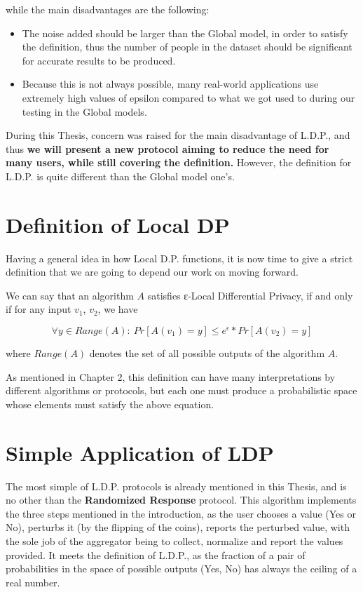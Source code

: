 while the main disadvantages are the following:

\begin{itemize}
    \item The noise added should be larger than the Global model, in order to satisfy the definition, thus the number of people in the dataset should be significant for accurate results to be produced.
    \item Because this is not always possible, many real-world applications use extremely high values of epsilon compared to what we got used to during our testing in the Global models.
\end{itemize}

During this Thesis, concern was raised for the main disadvantage of L.D.P., and thus\textbf{ we will present a new protocol aiming to reduce the need for many users, while still covering the definition.} However, the definition for L.D.P. is quite different than the Global model one's.

\section{Definition of Local DP}

Having a general idea in how Local D.P. functions, it is now time to give a strict definition that we are going to depend our work on moving forward.

We can say that an algorithm $A$ satisfies ε-Local Differential Privacy, if and only if for any input $v_1$, $v_2$, we have

$$ \forall y \in Range(A):\ Pr[A(v_1) = y] \leq e^{\epsilon} * Pr[A(v_2) = y] $$

where $Range(A)$ denotes the set of all possible outputs of the algorithm $A$.

As mentioned in Chapter 2, this definition can have many interpretations by different algorithms or protocols, but each one must produce a probabilistic space whose elements must satisfy the above equation.


\section{Simple Application of LDP}

The most simple of L.D.P. protocols is already mentioned in this Thesis, and is no other than the \textbf{Randomized Response} protocol. This algorithm implements the three steps mentioned in the introduction, as the user chooses a value (Yes or No), perturbs it (by the flipping of the coins), reports the perturbed value, with the sole job of the aggregator being to collect, normalize and report the values provided. It meets the definition of L.D.P., as the fraction of a pair of probabilities in the space of possible outputs (Yes, No) has always the ceiling of a real number. 


